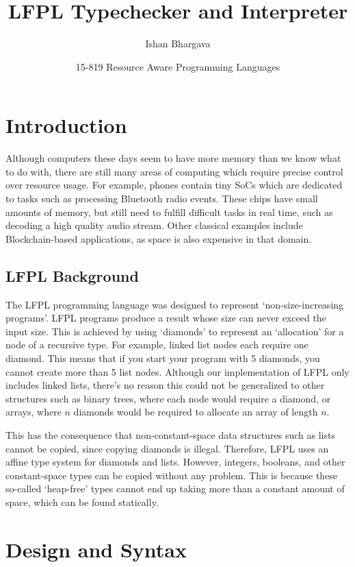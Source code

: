 \documentclass[12pt]{article}
\title{LFPL Typechecker and Interpreter}
\author{Ishan Bhargava}
\date{15-819 Resource Aware Programming Languages}
\begin{document}
\maketitle 

\section{Introduction}


Although computers these days seem to have more memory than we know what to do with, there are still many areas of computing which require precise control over resource usage. For example, phones contain tiny SoCs which are dedicated to tasks such as processing Bluetooth radio events. These chips have small amounts of memory, but still need to fulfill difficult tasks in real time, such as decoding a high quality audio stream. Other classical examples include Blockchain-based applications, as space is also expensive in that domain. 

\subsection{LFPL Background}

The LFPL programming language was designed to represent `non-size-increasing programs'. LFPL programs produce a result whose size can never exceed the input size. This is achieved by using `diamonds' to represent an `allocation' for a node of a recursive type. For example, linked list nodes each require one diamond. This means that if you start your program with 5 diamonds, you cannot create more than 5 list nodes. Although our implementation of LFPL only includes linked lists, there's no reason this could not be generalized to other structures such as binary trees, where each node would require a diamond, or arrays, where $n$ diamonds would be required to allocate an array of length $n$.

This has the consequence that non-constant-space data structures such as lists cannot be copied, since copying diamonds is illegal. Therefore, LFPL uses an affine type system for diamonds and lists. However, integers, booleans, and other constant-space types can be copied without any problem. This is because these so-called `heap-free' types cannot end up taking more than a constant amount of space, which can be found statically. 

\section{Design and Syntax}
\end{document}
